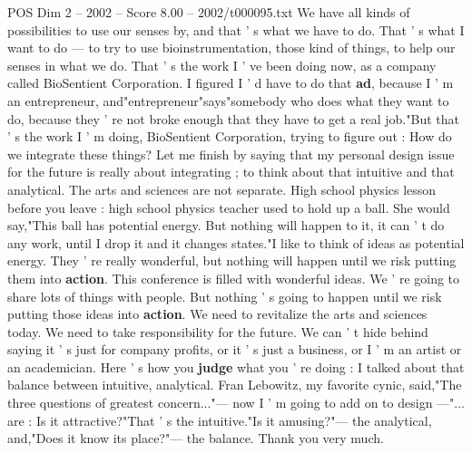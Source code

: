 \begin{textsample}{POS Dim 2 – 2002 – Score 8.00 – 2002/t000095.txt}
We have all kinds of possibilities to use our senses by, and that ' s what we have to do.
That ' s what I want to do — to try to use bioinstrumentation, those kind of things, to help our senses in what we do.
That ' s the work I ' ve been doing now, as a company called BioSentient Corporation.
I figured I ' d have to do that \textbf{ad}, because I ' m an entrepreneur, and"entrepreneur"says"somebody who does what they want to do, because they ' re not broke enough that they have to get a real job."But that ' s the work I ' m doing, BioSentient Corporation, trying to figure out : How do we integrate these things?
Let me finish by saying that my personal design issue for the future is really about integrating ; to think about that intuitive and that analytical.
The arts and sciences are not separate.
High school physics lesson before you leave : high school physics teacher used to hold up a ball.
She would say,"This ball has potential energy.
But nothing will happen to it, it can ' t do any work, until I drop it and it changes states."I like to think of ideas as potential energy.
They ' re really wonderful, but nothing will happen until we risk putting them into \textbf{action}.
This conference is filled with wonderful ideas.
We ' re going to share lots of things with people.
But nothing ' s going to happen until we risk putting those ideas into \textbf{action}.
We need to revitalize the arts and sciences today.
We need to take responsibility for the future.
We can ' t hide behind saying it ' s just for company profits, or it ' s just a business, or I ' m an artist or an academician.
Here ' s how you \textbf{judge} what you ' re doing : I talked about that balance between intuitive, analytical.
Fran Lebowitz, my favorite cynic, said,"The three questions of greatest concern..."— now I ' m going to add on to design —"... are : Is it attractive?"That ' s the intuitive."Is it amusing?"— the analytical, and,"Does it know its place?"— the balance.
Thank you very much.

\end{textsample}
